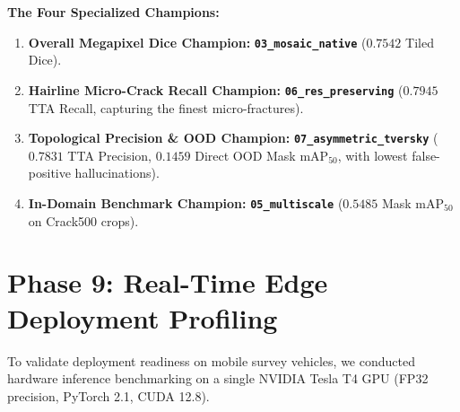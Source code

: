 \documentclass[11pt,a4paper]{article}
\begin{document}
\noindent\textbf{The Four Specialized Champions:}
\begin{enumerate}[leftmargin=1.5em]
  \item \textbf{Overall Megapixel Dice Champion:} \textbf{\texttt{03\_mosaic\_native}} ($\mathbf{0.7542}$ Tiled Dice).
  \item \textbf{Hairline Micro-Crack Recall Champion:} \textbf{\texttt{06\_res\_preserving}} ($\mathbf{0.7945}$ TTA Recall, capturing the finest micro-fractures).
  \item \textbf{Topological Precision \& OOD Champion:} \textbf{\texttt{07\_asymmetric\_tversky}} ($\mathbf{0.7831}$ TTA Precision, $\mathbf{0.1459}$ Direct OOD Mask mAP$_{50}$, with lowest false-positive hallucinations).
  \item \textbf{In-Domain Benchmark Champion:} \textbf{\texttt{05\_multiscale}} ($\mathbf{0.5485}$ Mask mAP$_{50}$ on Crack500 crops).
\end{enumerate}

\section{Phase 9: Real-Time Edge Deployment Profiling}
\label{sec:deployment}

To validate deployment readiness on mobile survey vehicles, we conducted hardware inference benchmarking on a single NVIDIA Tesla T4 GPU (FP32 precision, PyTorch 2.1, CUDA 12.8).
\end{document}

